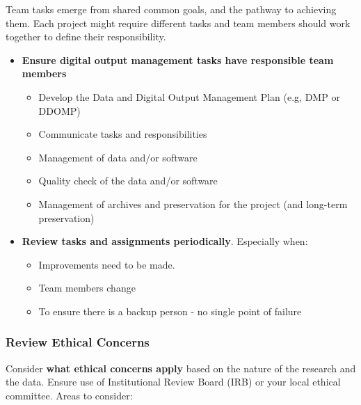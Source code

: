 \documentclass[
  letterpaper,
  DIV=11,
  numbers=noendperiod]{scrreport}
\providecommand{\tightlist}{%
  \setlength{\itemsep}{0pt}\setlength{\parskip}{0pt}}\usepackage{longtable,booktabs,array}
\begin{document}
Team tasks emerge from shared common goals, and the pathway to achieving
them. Each project might require different tasks and team members should
work together to define their responsibility.

\begin{itemize}
\tightlist
\item
  \textbf{Ensure digital output management tasks have responsible team
  members}

  \begin{itemize}
  \tightlist
  \item
    Develop the Data and Digital Output Management Plan (e.g, DMP or
    DDOMP)
  \item
    Communicate tasks and responsibilities
  \item
    Management of data and/or software
  \item
    Quality check of the data and/or software
  \item
    Management of archives and preservation for the project (and
    long-term preservation)
  \end{itemize}
\item
  \textbf{Review tasks and assignments periodically}. Especially when:

  \begin{itemize}
  \tightlist
  \item
    Improvements need to be made.
  \item
    Team members change
  \item
    To ensure there is a backup person - no single point of failure
  \end{itemize}
\end{itemize}

\hypertarget{review-ethical-concerns}{%
\subsubsection{Review Ethical Concerns}\label{review-ethical-concerns}}

Consider \textbf{what ethical concerns apply} based on the nature of the
research and the data. Ensure use of Institutional Review Board (IRB) or
your local ethical committee. Areas to consider:
\end{document}
